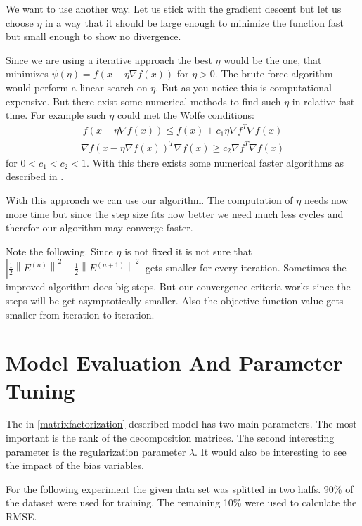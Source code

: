 \documentclass[DIV=14,twocolumn]{scrartcl}
\newcommand{\norm}[1]{\left\lVert#1\right\rVert}
\begin{document}
We want to use another way. Let us stick with the gradient descent but let us choose $\eta$ in a way that it should be large enough to minimize the function fast but small enough to show no divergence. 

Since we are using a iterative approach the best $\eta$ would be the one, that minimizes $\psi(\eta) = f(x-\eta\nabla f(x))$ for $\eta > 0$. The brute-force algorithm would perform a linear search on $\eta$. But as you notice this is computational expensive.  But there exist some numerical methods to find such $\eta$ in relative fast time. For example such $\eta$ could met the Wolfe conditions:
\begin{equation*}
\begin{split}
f(x-\eta\nabla f(x)) \leq f(x) + c_1\eta\nabla f^T\nabla f(x)
\end{split}
\end{equation*}
\begin{equation*}
\begin{split}
\nabla f(x-\eta\nabla f(x))^T\nabla f(x) \geq c_2\nabla f^T\nabla f(x)
\end{split}
\end{equation*}
for $0 < c_1 < c_2 < 1$.
With this there exists some numerical faster algorithms as described in \cite{NoWr06}.

With this approach we can use our algorithm. The computation of $\eta$ needs now more time but since the step size fits now better we need much less cycles and therefor our algorithm may converge faster. 

Note the following. Since $\eta$ is not fixed it is not sure that $|\frac{1}{2}\norm{E^{(n)}}^2-\frac{1}{2}\norm{E^{(n+1)}}^2|$ gets smaller for every iteration. Sometimes the improved algorithm does big steps. But our convergence criteria works since the steps will be get asymptotically smaller. Also the objective function value gets smaller from iteration to iteration. 

\section{Model Evaluation And Parameter Tuning}
The in \autoref{matrixfactorization} described model has two main parameters. The most important is the rank of the decomposition matrices. The second interesting parameter is the regularization parameter $\lambda$. It would also be interesting to see the impact of the bias variables.

For the following experiment the given data set was splitted in two halfs. 90\% of the dataset were used for training. The remaining 10\% were used to calculate the RMSE. 
\end{document}
